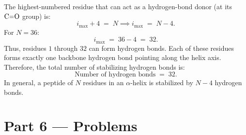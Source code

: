 \documentclass[12pt, a4paper]{book}
\begin{document}
\begin{problembox}
\begin{enumerate}[label=\textbf{E\arabic*.}]
        The highest-numbered residue that can act as a hydrogen-bond donor (at its $\ce{C=O}$ group) is:
        \[
          i_{\text{max}} + 4 \;=\; N \implies i_{\text{max}} \;=\; N - 4.
        \]
        For $N = 36$:
        \[
          i_{\text{max}} \;=\; 36 - 4 \;=\; 32.
        \]
        Thus, residues $1$ through $32$ can form hydrogen bonds.
        Each of these residues forms exactly one backbone hydrogen bond pointing along the helix axis.
        Therefore, the total number of stabilizing hydrogen bonds is:
        \[
          \text{Number of hydrogen bonds} \;=\; 32.
        \]
        In general, a peptide of $N$ residues in an $\alpha$-helix is stabilized by $N-4$ hydrogen bonds.
\end{enumerate}
\end{problembox}

\newpage

\section{Part 6 --- Problems}
\end{document}
